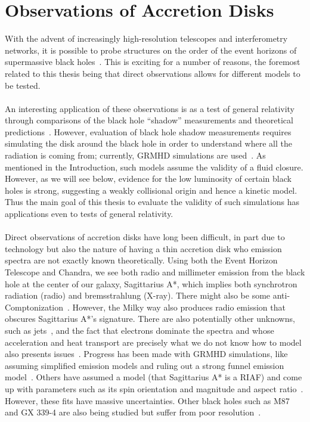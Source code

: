 \section{Observations of Accretion Disks} \label{sec:obsmotive}
With the advent of increasingly high-resolution telescopes and interferometry networks, it is possible to probe structures on the order of the event horizons of supermassive black holes~\cite{EHT}. This is exciting for a number of reasons, the foremost related to this thesis being that direct observations allows for different models to be tested.\\
\\
An interesting application of these observations is as a test of general relativity through comparisons of the black hole ``shadow'' measurements and theoretical predictions~\cite{Psaltis2015,Moscibrodzka2014}. However, evaluation of black hole shadow measurements requires simulating the disk around the black hole in order to understand where all the radiation is coming from; currently, GRMHD simulations are used~\cite{Psaltis2015}. As mentioned in the Introduction, such models assume the validity of a fluid closure. However, as we will see below, evidence for the low luminosity of certain black holes is strong, suggesting a weakly collisional origin and hence a kinetic model. Thus the main goal of this thesis to evaluate the validity of such simulations has applications even to tests of general relativity.\\
\\
Direct observations of accretion disks have long been difficult, in part due to technology but also the nature of having a thin accretion disk who emission spectra are not exactly known theoretically. Using both the Event Horizon Telescope and Chandra, we see both radio and millimeter emission from the black hole at the center of our galaxy, Sagittarius A*, which implies both synchrotron radiation (radio) and bremsstrahlung (X-ray). There might also be some anti-Comptonization~\cite{Oezel2001}. However, the Milky way also produces radio emission that obscures Sagittarius A*'s signature. There are also potentially other unknowns, such as jets~\cite{Moscibrodzka2014}, and the fact that electrons dominate the spectra and whose acceleration and heat transport are precisely what we do not know how to model also presents issues~\cite{Chan2015}. Progress has been made with GRMHD simulations, like assuming simplified emission models and ruling out a strong funnel emission model~\cite{Chan2015}. Others have assumed a model (that Sagittarius A* is a RIAF) and come up with parameters such as its spin orientation and magnitude and aspect ratio~\cite{Broderick2009,Broderick2011,Dexter2013}. However, these fits have massive uncertainties. Other black holes such as M87 and GX 339-4 are also being studied but suffer from poor resolution~\cite{Plant2014,Mccourt2016}. 

